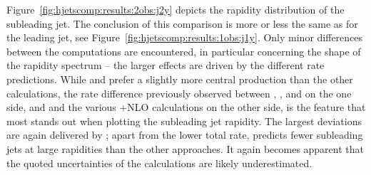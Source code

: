 Figure~\ref{fig:hjetscomp:results:2obs:j2y} depicts the rapidity
distribution of the subleading jet. The conclusion of this comparison is
more or less the same as for the leading jet, see
Figure~\ref{fig:hjetscomp:results:1obs:j1y}. Only minor differences 
between the computations are encountered, in particular concerning the
shape of the rapidity spectrum -- the larger effects are driven by the
different rate predictions. While \hjetscompSherpa \hjetscompNNLOPS and \hjetscompMGaMC prefer a
slightly more central production than the other calculations, the
rate difference previously observed between \hjetscompPowheg \hjetscompNNLOPS, \hjetscompMGaMC,
\hjetscompHerwig and \hjetscompSherpa \hjetscompMEPSatNLO on the one side, and \hjetscompSherpa \hjetscompNNLOPS and
the various \hjetscompGoSam{}+\hjetscompSherpa NLO calculations on the other side, is the
feature that most stands out when plotting the subleading jet rapidity.
The largest deviations are again delivered by \hjetscompHej; apart from the
lower total rate, \hjetscompHej predicts fewer subleading jets at large
rapidities than the other approaches. It again becomes apparent that
the quoted uncertainties of the \hjetscompNNLOPS calculations are likely
underestimated.

